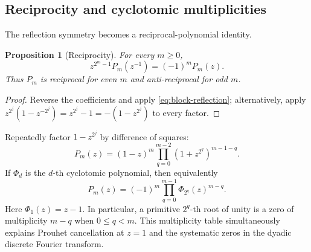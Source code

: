 \documentclass[11pt,oneside]{article}
\numberwithin{equation}{section}
\newtheorem{proposition}[theorem]{Proposition}
\theoremstyle{definition}
\theoremstyle{remark}
\begin{document}
\subsection{Reciprocity and cyclotomic multiplicities}

The reflection symmetry becomes a reciprocal-polynomial identity.

\begin{proposition}[Reciprocity]
\label{prop:reciprocity}
For every \(m\ge0\),
\begin{equation}
  z^{2^m-1}P_m(z^{-1})=(-1)^mP_m(z).
  \label{eq:Pm-reciprocity}
\end{equation}
Thus \(P_m\) is reciprocal for even \(m\) and anti-reciprocal for odd \(m\).
\end{proposition}

\begin{proof}
Reverse the coefficients and apply \eqref{eq:block-reflection}; alternatively,
apply \(z^{2^j}(1-z^{-2^j})=z^{2^j}-1=-(1-z^{2^j})\) to every factor.
\end{proof}

Repeatedly factor \(1-z^{2^j}\) by difference of squares:
\begin{equation}
  P_m(z)=(1-z)^m
   \prod_{q=0}^{m-2}(1+z^{2^q})^{m-1-q}.
  \label{eq:Pm-difference-squares}
\end{equation}
If \(\Phi_d\) is the \(d\)-th cyclotomic polynomial, then equivalently
\begin{equation}
  \boxed{
  P_m(z)=(-1)^m
   \prod_{q=0}^{m-1}\Phi_{2^q}(z)^{m-q}.}
  \label{eq:Pm-cyclotomic}
\end{equation}
Here \(\Phi_1(z)=z-1\).  In particular, a primitive \(2^q\)-th root of unity
is a zero of multiplicity \(m-q\) when \(0\le q<m\).  This multiplicity table
simultaneously explains Prouhet cancellation at \(z=1\) and the systematic
zeros in the dyadic discrete Fourier transform.
\end{document}

